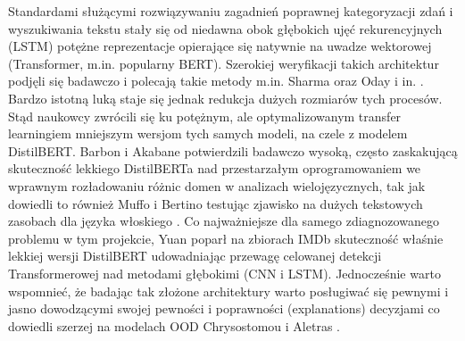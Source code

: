 \documentclass[runningheads]{llncs}
\begin{document}
Standardami służącymi rozwiązywaniu zagadnień poprawnej kategoryzacji zdań i wyszukiwania tekstu stały się od niedawna obok głębokich ujęć rekurencyjnych (LSTM) potężne reprezentacje opierające się natywnie na uwadze wektorowej (Transformer, m.in. popularny BERT). Szerokiej weryfikacji takich architektur podjęli się badawczo i polecają takie metody m.in. Sharma \cite{Sharma2025ACA} oraz Oday i in. \cite{Oday2025TextCF}. Bardzo istotną luką staje się jednak redukcja dużych rozmiarów tych procesów. Stąd naukowcy zwrócili się ku potężnym, ale optymalizowanym transfer learningiem mniejszym wersjom tych samych modeli, na czele z modelem DistilBERT. Barbon i Akabane \cite{s22218184} potwierdzili badawczo wysoką, często zaskakującą skuteczność lekkiego DistilBERTa nad przestarzałym oprogramowaniem we wprawnym rozładowaniu różnic domen w analizach wielojęzycznych, tak jak dowiedli to również Muffo i Bertino testując zjawisko na dużych tekstowych zasobach dla języka włoskiego \cite{muffo2023bertinoitaliandistilbertmodel}. Co najważniejsze dla samego zdiagnozowanego problemu w tym projekcie, Yuan \cite{Yuan2026EmpiricalSO} poparł na zbiorach IMDb skuteczność właśnie lekkiej wersji DistilBERT udowadniając przewagę celowanej detekcji Transformerowej nad metodami głębokimi (CNN i LSTM). Jednocześnie warto wspomnieć, że badając tak złożone architektury warto posługiwać się pewnymi i jasno dowodzącymi swojej pewności i poprawności (explanations) decyzjami co dowiedli szerzej na modelach OOD Chrysostomou i Aletras \cite{chrysostomou2022empiricalstudyexplanationsoutofdomain}.
\end{document}
